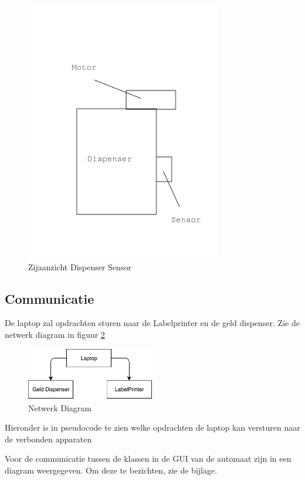 \documentclass{article}
\begin{document}
\begin{figure}[H]
	\centering
	\includegraphics[height=4.5in]{zijkantdispenser.png}
	\caption{Zijaanzicht Dispenser Sensor}
	\label{fig: Zijaanzicht Dispenser Sensor}
\end{figure}

\subsection{Communicatie}

De laptop zal opdrachten sturen naar de Labelprinter en de geld dispenser.
Zie de netwerk diagram in figuur \ref{fig: Netwerk Diagram}

\begin{figure}[H]
        \centering
        \includegraphics[height=0.9in]{netwerk_diagram.pdf}
        \caption{Netwerk Diagram}
        \label{fig: Netwerk Diagram}
\end{figure}

Hieronder is in pseudocode te zien welke opdrachten de laptop kan versturen naar de verbonden apparaten 


Voor de communicatie tussen de klassen in de GUI van de automaat zijn in een diagram weergegeven.
Om deze te bezichten, zie de bijlage.
\end{document}
